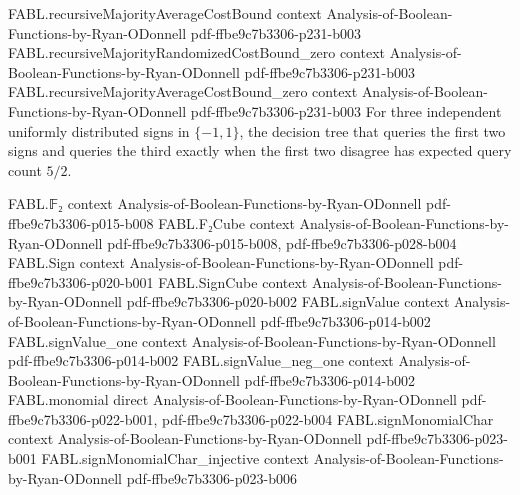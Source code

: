 \begin{theorem}
\proofstep
  {FABL.recursiveMajorityAverageCostBound}
  {context}
  {Analysis-of-Boolean-Functions-by-Ryan-ODonnell}
  {pdf-ffbe9c7b3306-p231-b003}
\proofstep
  {FABL.recursiveMajorityRandomizedCostBound_zero}
  {context}
  {Analysis-of-Boolean-Functions-by-Ryan-ODonnell}
  {pdf-ffbe9c7b3306-p231-b003}
\proofstep
  {FABL.recursiveMajorityAverageCostBound_zero}
  {context}
  {Analysis-of-Boolean-Functions-by-Ryan-ODonnell}
  {pdf-ffbe9c7b3306-p231-b003}
For three independent uniformly distributed signs in $\{-1,1\}$, the decision tree that
queries the first two signs and queries the third exactly when the first two disagree
has expected query count $5/2$.
\end{theorem}

\begin{theorem}
\label{FABL.randomizedDecisionTreeComplexity_majority_three_le}
\leanok
{}
\proofstep
  {FABL.𝔽₂}
  {context}
  {Analysis-of-Boolean-Functions-by-Ryan-ODonnell}
  {pdf-ffbe9c7b3306-p015-b008}
\proofstep
  {FABL.F₂Cube}
  {context}
  {Analysis-of-Boolean-Functions-by-Ryan-ODonnell}
  {pdf-ffbe9c7b3306-p015-b008,
    pdf-ffbe9c7b3306-p028-b004}
\proofstep
  {FABL.Sign}
  {context}
  {Analysis-of-Boolean-Functions-by-Ryan-ODonnell}
  {pdf-ffbe9c7b3306-p020-b001}
\proofstep
  {FABL.SignCube}
  {context}
  {Analysis-of-Boolean-Functions-by-Ryan-ODonnell}
  {pdf-ffbe9c7b3306-p020-b002}
\proofstep
  {FABL.signValue}
  {context}
  {Analysis-of-Boolean-Functions-by-Ryan-ODonnell}
  {pdf-ffbe9c7b3306-p014-b002}
\proofstep
  {FABL.signValue_one}
  {context}
  {Analysis-of-Boolean-Functions-by-Ryan-ODonnell}
  {pdf-ffbe9c7b3306-p014-b002}
\proofstep
  {FABL.signValue_neg_one}
  {context}
  {Analysis-of-Boolean-Functions-by-Ryan-ODonnell}
  {pdf-ffbe9c7b3306-p014-b002}
\proofstep
  {FABL.monomial}
  {direct}
  {Analysis-of-Boolean-Functions-by-Ryan-ODonnell}
  {pdf-ffbe9c7b3306-p022-b001,
    pdf-ffbe9c7b3306-p022-b004}
\proofstep
  {FABL.signMonomialChar}
  {context}
  {Analysis-of-Boolean-Functions-by-Ryan-ODonnell}
  {pdf-ffbe9c7b3306-p023-b001}
\proofstep
  {FABL.signMonomialChar_injective}
  {context}
  {Analysis-of-Boolean-Functions-by-Ryan-ODonnell}
  {pdf-ffbe9c7b3306-p023-b006}

\end{theorem}
